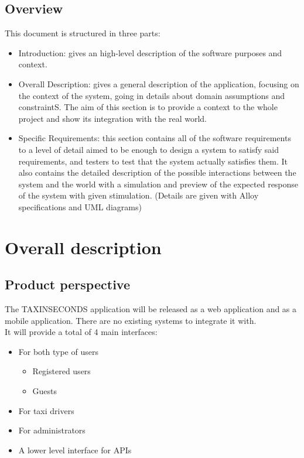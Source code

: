 \documentclass{article}
\begin{document}
\subsection{Overview}
This document is structured in three parts:
\begin{itemize}
	\item Introduction: gives an high-level description of the software purposes and context.
	\item Overall Description: gives a general description of the application, focusing on the context of the system, going in details about domain assumptions and constraintS. The aim of this section is to provide a context to the whole project and show its integration with the real world.
	\item Specific Requirements: this section contains all of the software requirements to a level of detail aimed to be enough to design a system to satisfy said requirements, and testers to test that the system actually satisfies them. It also contains the detailed description of the possible interactions between the system and the world with a simulation and preview of the expected response of the system with given stimulation. (Details are given with Alloy specifications and UML diagrams)
\end{itemize}


\section{Overall description}
\subsection{Product perspective}
The TAXINSECONDS application will be released as a web application and as a mobile application. 
There are no existing systems to integrate it with. 
\\It will provide a total of 4 main interfaces:
\begin{itemize}
	\item For both type of users
		\begin{itemize}
			\item Registered users
			\item Guests
		\end{itemize}
	\item For taxi drivers 
	\item For administrators
	\item A lower level interface for APIs %
\end{itemize}
\end{document}
